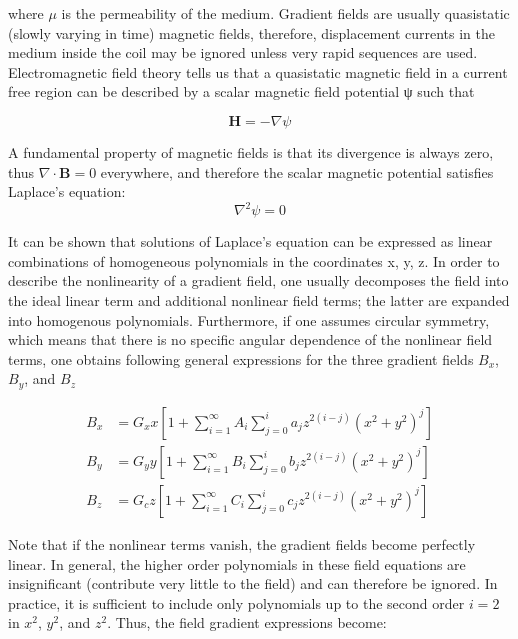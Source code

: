 where $\mu$ is the permeability of the medium. Gradient fields are usually quasistatic (slowly varying in time) magnetic fields, therefore, displacement currents in the medium inside the coil may be ignored unless very rapid sequences are used. Electromagnetic field theory tells us that a quasistatic magnetic field in a current free region can be described by a scalar magnetic field potential ψ such that 

\begin{equation}
  \textbf{H} = - \nabla \psi 
\end{equation}

A fundamental property of magnetic fields is that its divergence is always zero, thus $\nabla \cdot \mathbf{B} = 0$ everywhere, and therefore the scalar magnetic potential satisfies Laplace’s equation:
\begin{equation}
  \nabla^2 \psi = 0 
\end{equation}

It can be shown that solutions of Laplace’s equation can be expressed as linear combinations of 
homogeneous polynomials  in the coordinates x, y, z. In order to describe the nonlinearity of a 
gradient field, one usually decomposes the field into the ideal linear term and additional nonlinear 
field terms; the latter are expanded into homogenous polynomials. Furthermore, if one assumes circular 
symmetry, which means that there is no specific angular dependence of the nonlinear field terms, one 
obtains following general expressions for the three gradient fields $B_x$, $B_y$, and $B_z$

\begin{align}
  B_x &= G_x x \left[ 1 + \sum^{\infty}_{i=1}A_i\sum^{i}_{j=0}a_jz^{2(i-j)}(x^2 + y^2)^j \right] \nonumber \\
  B_y &= G_y y \left[ 1 + \sum^{\infty}_{i=1}B_i\sum^{i}_{j=0}b_jz^{2(i-j)}(x^2 + y^2)^j \right] \label{eqn:distortion1}\\
  B_z &= G_c z \left[ 1 + \sum^{\infty}_{i=1}C_i\sum^{i}_{j=0}c_jz^{2(i-j)}(x^2 + y^2)^j \right] \nonumber 
\end{align}

Note that if the nonlinear terms vanish, the gradient fields become perfectly linear. In general, the higher order polynomials in these field equations are insignificant (contribute very little to the field) and can therefore be ignored. In practice, it is sufficient to include only polynomials up to the second order $i = 2$ in $x^2$, $y^2$, and $z^2$. Thus, the field gradient expressions become:

